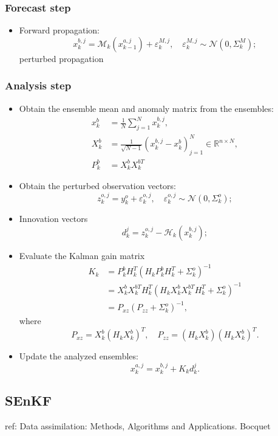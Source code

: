 \documentclass{article}
\begin{document}
\subsubsection{Forecast step}
\begin{itemize}
	\item Forward propagation:
	      $$
		      x_k^{b,j}=\mathcal{M}_k(x_{k-1}^{a,j})+\varepsilon_k^{M,j},\quad \varepsilon_k^{M,j}\sim\mathcal{N}(0,\Sigma_k^M);
	      $$
	      perturbed propagation

\end{itemize}
\subsubsection{Analysis step}
\begin{itemize}
	\item Obtain the ensemble mean and anomaly matrix from the ensembles:
	      \begin{align*}
		      x_k^b & = \frac1N\sum_{j=1}^Nx_k^{b,j},                                           \\
		      X_k^b & = \frac1{\sqrt{N-1}}(x_k^{b,j} - x_k^b)_{j=1}^N\in\mathbb{R}^{n\times N}, \\
		      P_k^b & = X_k^bX_k^{bT}
	      \end{align*}
	\item Obtain the perturbed observation vectors:
	      $$
		      z_k^{o,j} = y_k^o + \varepsilon_k^{o,j},\quad\varepsilon_k^{o,j}\sim\mathcal{N}(0,\Sigma_k^o);
	      $$
	\item Innovation vectors
	      $$
		      d_k^j = z_k^{o,j} - \mathcal{H}_k(x_k^{b,j});
	      $$
	\item Evaluate the Kalman gain matrix
	      \begin{align*}
		      K_k & = P_k^bH_k^T(H_kP_k^bH_k^T+\Sigma_k^o)^{-1}                 \\
		          & = X_k^bX_k^{bT}H_k^T(H_kX_k^bX_k^{bT}H_k^T+\Sigma_k^o)^{-1} \\
		          & = P_{xz}(P_{zz}+\Sigma_k^o)^{-1},
	      \end{align*}
	      where
	      $$
		      P_{xz} = X_k^b(H_kX_k^b)^T,\quad P_{zz} = (H_kX_k^b)(H_kX_k^b)^T.
	      $$
	\item Update the analyzed ensembles:
	      $$
		      x_k^{a,j}=x_k^{b,j}+K_kd_k^j.
	      $$
\end{itemize}
\subsection{SEnKF}
ref:
Data assimilation: Methods, Algorithms and Applications. Bocquet
\end{document}
